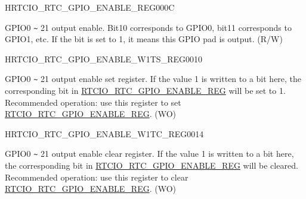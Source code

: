 \begin{register}{H}{RTCIO\_RTC\_GPIO\_ENABLE\_REG}{\hexprefix{}000C}\label{regdesc:RTCIORTCGPIOENABLEREG}
%
%
\regnewline%
\begin{regdesc}\begin{reglist}
\label{fielddesc:RTCIOGPIOENABLE}\item [RTCIO\_GPIO\_ENABLE] GPIO0 \verb+~+ 21 output enable. Bit10 corresponds to GPIO0, bit11 corresponds to GPIO1, etc. If the bit is set to 1, it means this GPIO pad is output. (R/W)
\end{reglist}\end{regdesc}
\end{register}


\begin{register}{H}{RTCIO\_RTC\_GPIO\_ENABLE\_W1TS\_REG}{\hexprefix{}0010}\label{regdesc:RTCIORTCGPIOENABLEW1TSREG}
%
%
\regnewline%
\begin{regdesc}\begin{reglist}
\label{fielddesc:RTCIOGPIOENABLEW1TS}\item [RTCIO\_GPIO\_ENABLE\_W1TS] GPIO0 \verb+~+ 21 output enable set register. If the value 1 is written to a bit here, the corresponding bit in \hyperref[regdesc:RTCIORTCGPIOENABLEREG]{RTCIO\_RTC\_GPIO\_ENABLE\_REG} will be set to 1. Recommended operation: use this register to set \hyperref[regdesc:RTCIORTCGPIOENABLEREG]{RTCIO\_RTC\_GPIO\_ENABLE\_REG}. (WO)
\end{reglist}\end{regdesc}
\end{register}


\begin{register}{H}{RTCIO\_RTC\_GPIO\_ENABLE\_W1TC\_REG}{\hexprefix{}0014}\label{regdesc:RTCIORTCGPIOENABLEW1TCREG}
%
%
\regnewline%
\begin{regdesc}\begin{reglist}
\label{fielddesc:RTCIOGPIOENABLEW1TC}\item [RTCIO\_GPIO\_ENABLE\_W1TC] GPIO0 \verb+~+ 21 output enable clear register. If the value 1 is written to a bit here, the corresponding bit in \hyperref[regdesc:RTCIORTCGPIOENABLEREG]{RTCIO\_RTC\_GPIO\_ENABLE\_REG} will be cleared. Recommended operation: use this register to clear \hyperref[regdesc:RTCIORTCGPIOENABLEREG]{RTCIO\_RTC\_GPIO\_ENABLE\_REG}. (WO)
\end{reglist}\end{regdesc}
\end{register}


